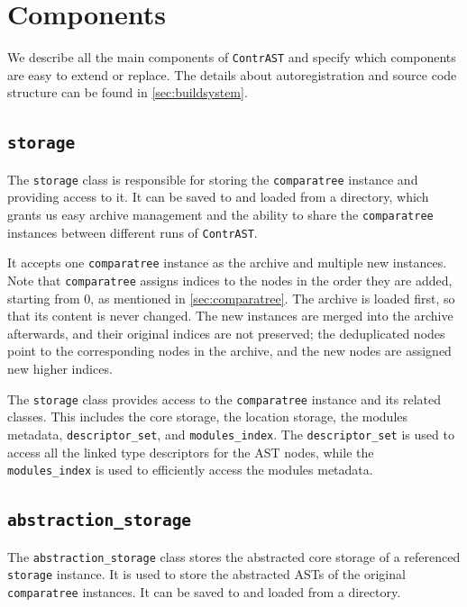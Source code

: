 \section{Components}\label{sec:components}

We describe all the main components of \texttt{ContrAST} and specify which components are easy to extend or replace.
The details about autoregistration and source code structure can be found in \autoref{sec:buildsystem}.

\subsection{\texttt{storage}}

The \texttt{storage} class is responsible for storing the \texttt{comparatree} instance and providing access to it.
It can be saved to and loaded from a directory, which grants us easy archive management and the ability to share the \texttt{comparatree} instances between different runs of \texttt{ContrAST}.

It accepts one \texttt{comparatree} instance as the archive and multiple new instances.
Note that \texttt{comparatree} assigns indices to the nodes in the order they are added, starting from 0, as mentioned in \autoref{sec:comparatree}.
The archive is loaded first, so that its content is never changed.
The new instances are merged into the archive afterwards, and their original indices are not preserved; the deduplicated nodes point to the corresponding nodes in the archive, and the new nodes are assigned new higher indices.

The \texttt{storage} class provides access to the \texttt{comparatree} instance and its related classes.
This includes the core storage, the location storage, the modules metadata, \texttt{descriptor\_set}, and \texttt{modules\_index}.
The \texttt{descriptor\_set} is used to access all the linked type descriptors for the AST nodes, while the \texttt{modules\_index} is used to efficiently access the modules metadata.

\subsection{\texttt{abstraction\_storage}}

The \texttt{abstraction\_storage} class stores the abstracted core storage of a referenced \texttt{storage} instance.
It is used to store the abstracted ASTs of the original \texttt{comparatree} instances.
It can be saved to and loaded from a directory.

